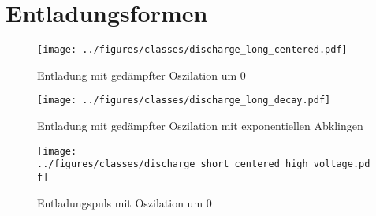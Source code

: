 \section{Entladungsformen}


\begin{figure}[H]
    \centering
    \texttt{[image: ../figures/classes/discharge\_long\_centered.pdf]}
    \caption{Entladung mit gedämpfter Oszilation um 0}
    \label{fig:discharge-long-centered}
\end{figure}

\begin{figure}[H]
    \centering
    \texttt{[image: ../figures/classes/discharge\_long\_decay.pdf]}
    \caption{Entladung mit gedämpfter Oszilation mit exponentiellen Abklingen}
    \label{fig:discharge-long-decay}
\end{figure}

\begin{figure}[H]
    \centering
    \texttt{[image: ../figures/classes/discharge\_short\_centered\_high\_voltage.pdf]}
    \caption{Entladungspuls mit Oszilation um 0}
    \label{fig:discharge-short-centered}
\end{figure}





